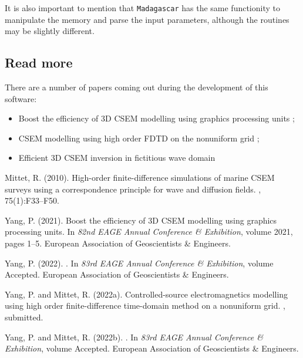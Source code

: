 \documentclass[10pt]{article}
\begin{document}
It is also important to mention that \texttt{Madagascar} has the same functionity to manipulate the memory and parse the input parameters, although the routines may be slightly different.

\subsection{Read more}

There are a number of papers coming out during the development of this software:
\begin{itemize}
 \item Boost the efficiency of 3D CSEM modelling using graphics processing units \citep{Yang_2021_GPU_CSEM};
 \item CSEM modelling using high order FDTD on the nonuniform grid \citep{Yang_2022_HFD_NUgrid,Yang2022HFDNU};
 \item Efficient 3D CSEM inversion in fictitious wave domain \citep{Yang_2022_EAGE_Efficient}
\end{itemize}



\newpage

\newcommand{\SortNoop}[1]{}
\begin{thebibliography}{}

Mittet, R. (2010).
\newblock High-order finite-difference simulations of marine {CSEM} surveys
  using a correspondence principle for wave and diffusion fields.
, 75(1):F33--F50.

Yang, P. (2021).
\newblock Boost the efficiency of 3{D} {CSEM} modelling using graphics
  processing units.
\newblock In {\em 82nd EAGE Annual Conference \& Exhibition}, volume 2021,
  pages 1--5. European Association of Geoscientists \& Engineers.

Yang, P. (2022).
.
\newblock In {\em 83rd EAGE Annual Conference \& Exhibition}, volume Accepted.
  European Association of Geoscientists \& Engineers.

Yang, P. and Mittet, R. (2022a).
\newblock Controlled-source electromagnetics modelling using high order
  finite-difference time-domain method on a nonuniform grid.
, submitted.

Yang, P. and Mittet, R. (2022b).
.
\newblock In {\em 83rd EAGE Annual Conference \& Exhibition}, volume Accepted.
  European Association of Geoscientists \& Engineers.

\end{thebibliography}
\end{document}
